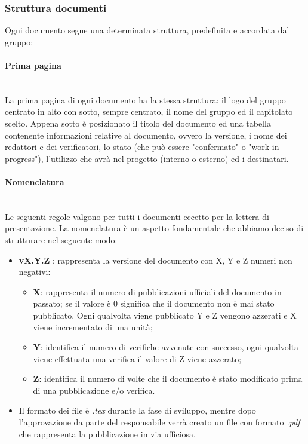 \subsubsection{Struttura documenti}\label{ProcessiSupporto_Documentazione_StrutturaDocumenti}
Ogni documento segue una determinata struttura, predefinita e accordata dal gruppo:

\paragraph{Prima pagina} \-\\
La prima pagina di ogni documento ha la stessa struttura: il logo del gruppo centrato in alto con sotto, sempre centrato, il nome del gruppo ed il capitolato scelto. Appena sotto è posizionato il titolo del documento ed una tabella contenente informazioni relative al documento, ovvero la versione, i nome dei redattori e dei verificatori, lo stato (che può essere "confermato" o "work in progress"), l'utilizzo che avrà nel progetto (interno o esterno) ed i destinatari.

\paragraph{Nomenclatura} \-\\
Le seguenti regole valgono per tutti i documenti eccetto per la lettera di presentazione. La nomenclatura è un aspetto fondamentale che abbiamo deciso di strutturare nel seguente modo: 
\begin{itemize}
	\item \textbf{vX.Y.Z }: rappresenta la versione del documento con X, Y e Z numeri non negativi:
	\begin{itemize}
		\item \textbf{X}: rappresenta il numero di pubblicazioni ufficiali del documento in passato; se il valore è 0 significa che il documento non è mai stato pubblicato. Ogni qualvolta viene pubblicato Y e Z vengono azzerati e X viene incrementato di una unità;
		\item \textbf{Y}: identifica il numero di verifiche avvenute con successo, ogni qualvolta viene effettuata una verifica il valore di Z viene azzerato;
		\item \textbf{Z}: identifica il numero di volte che il documento è stato modificato prima di una pubblicazione e/o verifica.
	\end{itemize}
	\item Il formato dei file è \textit{.tex} durante la fase di sviluppo, mentre dopo l'approvazione da parte del responsabile verrà creato un file con formato \textit{.pdf} che rappresenta la pubblicazione in via ufficiosa.
\end{itemize}

